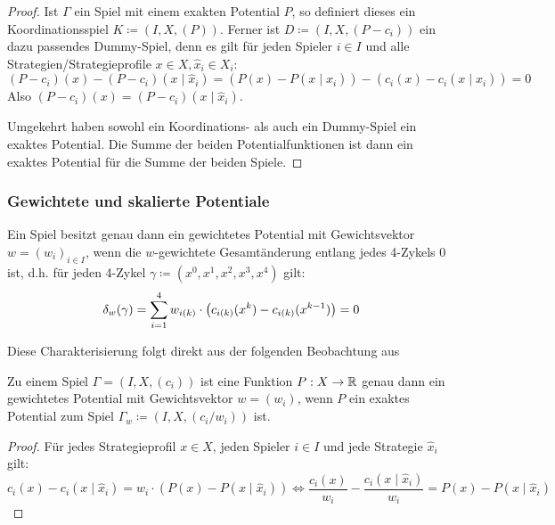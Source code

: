 \begin{proof}
	Ist $\Gamma$ ein Spiel mit einem exakten Potential $P$, so definiert dieses ein Koordinationsspiel $K \coloneqq (I, X, (P))$. Ferner ist $D \coloneqq (I, X, (P-c_i))$ ein dazu passendes Dummy-Spiel, denn es gilt für jeden Spieler $i \in I$ und alle Strategien/Strategieprofile $x \in X, \hat{x}_i \in X_i$:
		\[(P-c_i)(x) - (P-c_i)(x \mid \hat{x}_i) = \left(P(x) - P(x \mid \hat{x}_i)\right) - \left(c_i(x) - c_i(x \mid \hat{x}_i)\right) = 0 \]
	Also $(P-c_i)(x) = (P-c_i)(x \mid \hat{x}_i)$.
	
	Umgekehrt haben sowohl ein Koordinations- als auch ein Dummy-Spiel ein exaktes Potential. Die Summe der beiden Potentialfunktionen ist dann ein exaktes Potential für die Summe der beiden Spiele.
\end{proof}


\subsubsection{Gewichtete und skalierte Potentiale}

\begin{satz}\label{satz:CharGewPot}
	Ein Spiel besitzt genau dann ein gewichtetes Potential mit Gewichtsvektor $w = (w_i)_{i \in I}$, wenn die $w$-gewichtete Gesamtänderung entlang jedes 4-Zykels $0$ ist, d.h. für jeden 4-Zykel $\gamma \coloneqq (x^0, x^1, x^2, x^3, x^4)$ gilt:
	\[\delta_w(\gamma) = \sum_{i=1}^4 w_{i(k)}\cdot\left(c_{i(k)}(x^k) - c_{i(k)}(x^{k-1})\right) = 0\]
\end{satz}

Diese Charakterisierung folgt direkt aus der folgenden Beobachtung aus \cite[Kapitel 3.2]{CharExGewPotinWCG}

\begin{beob}\label{beob:ZshExGewPot}
	Zu einem Spiel $\Gamma = (I, X, (c_i))$ ist eine Funktion $P: X \to \mathbb{R}$ genau dann ein gewichtetes Potential mit Gewichtsvektor $w = (w_i)$, wenn $P$ ein exaktes Potential zum Spiel $\Gamma_w \coloneqq (I, X, (c_i/w_i))$ ist.
\end{beob}

\begin{proof}
	Für jedes Strategieprofil $x \in X$, jeden Spieler $i \in I$ und jede Strategie $\hat{x}_i$ gilt:
		\[c_i(x) - c_i(x \mid \hat{x}_i) = w_i\cdot(P(x) - P(x \mid \hat{x}_i)) \iff \frac{c_i(x)}{w_i} - \frac{c_i(x \mid \hat{x}_i)}{w_i} = P(x) - P(x \mid \hat{x}_i) \]
\end{proof}

